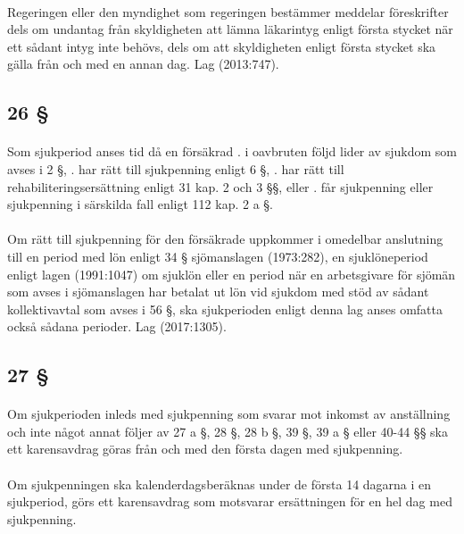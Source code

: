 \documentclass[a4paper,notitlepage,openany,10pt]{book}
\begin{document}
\paragraph*{}
Regeringen eller den myndighet som regeringen bestämmer meddelar föreskrifter dels om undantag från skyldigheten att lämna läkarintyg enligt första stycket när ett sådant intyg inte behövs, dels om att skyldigheten enligt första stycket ska gälla från och med en annan dag.
Lag (2013:747).
\subsection*{26 §}
\paragraph*{}
Som sjukperiod anses tid då en försäkrad
. i oavbruten följd lider av sjukdom som avses i 2 §,
. har rätt till sjukpenning enligt 6 §,
. har rätt till rehabiliteringsersättning enligt 31 kap. 2 och 3 §§, eller
. får sjukpenning eller sjukpenning i särskilda fall enligt 112 kap. 2 a §.
\paragraph*{}
Om rätt till sjukpenning för den försäkrade uppkommer i omedelbar anslutning till en period med lön enligt 34 § sjömanslagen (1973:282), en sjuklöneperiod enligt lagen (1991:1047) om sjuklön eller en period när en arbetsgivare för sjömän som avses i sjömanslagen har betalat ut lön vid sjukdom med stöd av sådant kollektivavtal som avses i 56 §, ska sjukperioden enligt denna lag anses omfatta också sådana perioder.
Lag (2017:1305).
\subsection*{27 §}
\paragraph*{}
Om sjukperioden inleds med sjukpenning som svarar mot inkomst av anställning och inte något annat följer av 27 a §, 28 §, 28 b §, 39 §, 39 a § eller 40-44 §§ ska ett karensavdrag göras från och med den första dagen med sjukpenning.
\paragraph*{}
Om sjukpenningen ska kalenderdagsberäknas under de första 14 dagarna i en sjukperiod, görs ett karensavdrag som motsvarar ersättningen för en hel dag med sjukpenning.
\end{document}

